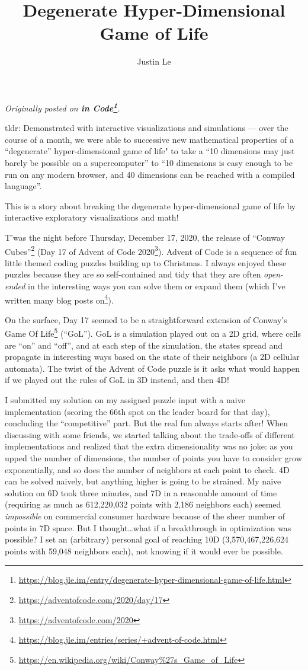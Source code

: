 \documentclass[]{article}
\title{Degenerate Hyper-Dimensional Game of Life}
\author{Justin Le}
\renewcommand{\href}[2]{#2\footnote{\url{#1}}}
\begin{document}
\maketitle

\emph{Originally posted on
\textbf{\href{https://blog.jle.im/entry/degenerate-hyper-dimensional-game-of-life.html}{in
Code}}.}

tldr: Demonstrated with interactive visualizations and simulations --- over the
course of a month, we were able to successive new mathematical properties of a
``degenerate'' hyper-dimensional game of life" to take a ``10 dimensions may
just barely be possible on a supercomputer'' to ``10 dimensions is easy enough
to be run on any modern browser, and 40 dimensions can be reached with a
compiled language''.

This is a story about breaking the degenerate hyper-dimensional game of life by
interactive exploratory visualizations and math!

T'was the night before Thursday, December 17, 2020, the release of
\href{https://adventofcode.com/2020/day/17}{``Conway Cubes''} (Day 17 of
\href{https://adventofcode.com/2020}{Advent of Code 2020}). Advent of Code is a
sequence of fun little themed coding puzzles building up to Christmas. I always
enjoyed these puzzles because they are so self-contained and tidy that they are
often \emph{open-ended} in the interesting ways you can solve them or expand
them (which I've written
\href{https://blog.jle.im/entries/series/+advent-of-code.html}{many blog posts
on}).

On the surface, Day 17 seemed to be a straightforward extension of
\href{https://en.wikipedia.org/wiki/Conway\%27s_Game_of_Life}{Conway's Game Of
Life} (``GoL''). GoL is a simulation played out on a 2D grid, where cells are
``on'' and ``off'', and at each step of the simulation, the states spread and
propagate in interesting ways based on the state of their neighbors (a 2D
cellular automata). The twist of the Advent of Code puzzle is it asks what would
happen if we played out the rules of GoL in 3D instead, and then 4D!

I submitted my solution on my assigned puzzle input with a naive implementation
(scoring the 66th spot on the leader board for that day), concluding the
``competitive'' part. But the real fun always starts after! When discussing with
some friends, we started talking about the trade-offs of different
implementations and realized that the extra dimensionality was no joke: as you
upped the number of dimensions, the number of points you have to consider grow
exponentially, and so does the number of neighbors at each point to check. 4D
can be solved naively, but anything higher is going to be strained. My naive
solution on 6D took three minutes, and 7D in a reasonable amount of time
(requiring as much as 612,220,032 points with 2,186 neighbors each) seemed
\emph{impossible} on commercial consumer hardware because of the sheer number of
points in 7D space. But I thought\ldots what if a breakthrough in optimization
was possible? I set an (arbitrary) personal goal of reaching 10D
(3,570,467,226,624 points with 59,048 neighbors each), not knowing if it would
ever be possible.
\end{document}
